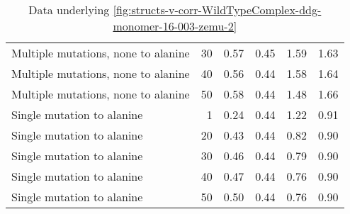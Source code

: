 \begin{table}
\begin{tabular}{lrrrrr}
 Multiple mutations, none to alanine &            30 &             0.57 &                    0.45 &               1.59 &                      1.63 \\
 Multiple mutations, none to alanine &            40 &             0.56 &                    0.44 &               1.58 &                      1.64 \\
 Multiple mutations, none to alanine &            50 &             0.58 &                    0.44 &               1.48 &                      1.66 \\
          Single mutation to alanine &             1 &             0.24 &                    0.44 &               1.22 &                      0.91 \\
          Single mutation to alanine &            20 &             0.43 &                    0.44 &               0.82 &                      0.90 \\
          Single mutation to alanine &            30 &             0.46 &                    0.44 &               0.79 &                      0.90 \\
          Single mutation to alanine &            40 &             0.47 &                    0.44 &               0.76 &                      0.90 \\
          Single mutation to alanine &            50 &             0.50 &                    0.44 &               0.76 &                      0.90 \\
\bottomrule
\end{tabular}

\caption[]{Data underlying \cref{fig:structs-v-corr-WildTypeComplex-ddg-monomer-16-003-zemu-2}}
\label{tab:structs-v-corr-WildTypeComplex-ddg-monomer-16-003-zemu-2-underlying-data}
\end{table}
